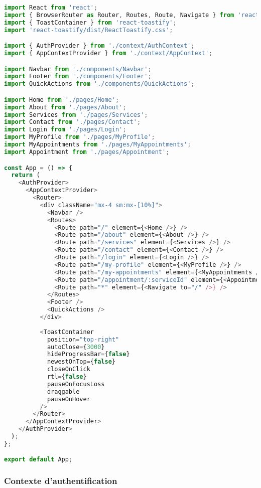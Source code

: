\begin{lstlisting}[language=JavaScript, caption=Composant App.jsx principal]
import React from 'react';
import { BrowserRouter as Router, Routes, Route, Navigate } from 'react-router-dom';
import { ToastContainer } from 'react-toastify';
import 'react-toastify/dist/ReactToastify.css';

import { AuthProvider } from './context/AuthContext';
import { AppContextProvider } from './context/AppContext';

import Navbar from './components/Navbar';
import Footer from './components/Footer';
import QuickActions from './components/QuickActions';

import Home from './pages/Home';
import About from './pages/About';
import Services from './pages/Services';
import Contact from './pages/Contact';
import Login from './pages/Login';
import MyProfile from './pages/MyProfile';
import MyAppointments from './pages/MyAppointments';
import Appointment from './pages/Appointment';

const App = () => {
  return (
    <AuthProvider>
      <AppContextProvider>
        <Router>
          <div className="mx-4 sm:mx-[10%]">
            <Navbar />
            <Routes>
              <Route path="/" element={<Home />} />
              <Route path="/about" element={<About />} />
              <Route path="/services" element={<Services />} />
              <Route path="/contact" element={<Contact />} />
              <Route path="/login" element={<Login />} />
              <Route path="/my-profile" element={<MyProfile />} />
              <Route path="/my-appointments" element={<MyAppointments />} />
              <Route path="/appointment/:serviceId" element={<Appointment />} />
              <Route path="*" element={<Navigate to="/" />} />
            </Routes>
            <Footer />
            <QuickActions />
          </div>
          
          <ToastContainer
            position="top-right"
            autoClose={3000}
            hideProgressBar={false}
            newestOnTop={false}
            closeOnClick
            rtl={false}
            pauseOnFocusLoss
            draggable
            pauseOnHover
          />
        </Router>
      </AppContextProvider>
    </AuthProvider>
  );
};

export default App;
\end{lstlisting}

\subsubsection{Contexte d'authentification}

